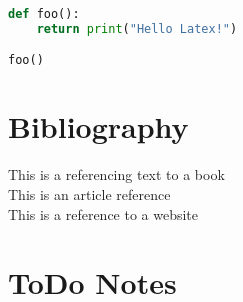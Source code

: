 \documentclass[12pt]{article}
\begin{document}
\begin{lstlisting}[language=Python, caption=Python example]
def foo():
    return print("Hello Latex!")

foo()
\end{lstlisting}

\pagebreak 

\section{Bibliography}

This is a referencing text to a book \cite{latexcompanion} \\
This is an article reference \cite{einstein} \\
This is a reference to a website \cite{knuthwebsite} \\




\section{ToDo Notes}
\end{document}
